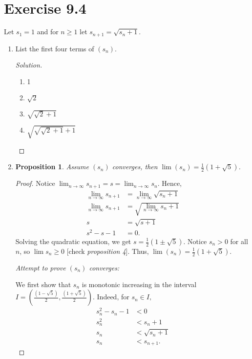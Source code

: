 \documentclass{article}
\newtheorem{proposition}[thm]{Proposition}
\begin{document}
\section*{Exercise 9.4}
Let $s_1=1$ and for $n\ge1$ let $s_{n+1}=\sqrt{s_n+1}$.
\begin{enumerate}[label=(\alph*)]
    \item List the first four terms of $(s_n)$.
    \begin{proof}[Solution]\indent
        \begin{enumerate}[label=\arabic*.]
            \item 1
            \item $\sqrt{2}$
            \item $\sqrt{\sqrt{2}+1}$
            \item $\sqrt{\sqrt{\sqrt{2}+1}+1}$
        \end{enumerate}
    \end{proof}

    \item
    \begin{proposition}
        Assume $(s_n)$ converges, then $\lim (s_n) = \frac{1}{2}\left(1+\sqrt{5}\right)$.
    \end{proposition}
    \begin{proof}
        Notice $\lim_{n\rightarrow\infty}s_{n+1} = s = \lim_{n\rightarrow\infty}s_n$. Hence, 
        \begin{align*}
            \lim_{n\rightarrow\infty} s_{n+1} & = \lim_{n\rightarrow\infty} \sqrt{s_n+1} \\
            \lim_{n\rightarrow\infty} s_{n+1} & = \sqrt{\lim_{n\rightarrow\infty} s_n+1} \\ 
            s & = \sqrt{s+1} \\
            s^2 - s - 1 & = 0.
        \end{align*}
        Solving the quadratic equation, we get $s = \frac{1}{2}\left(1\pm\sqrt{5}\right)$.
        Notice $s_n > 0$ for all $n$, so $\lim s_n\ge 0$ [check \emph{proposition 4}]. Thus, 
        $\lim (s_n) = \frac{1}{2}\left(1+\sqrt{5}\right)$.
        
        \newpage
        \emph{Attempt to prove $(s_n)$ converges:}

        We first show that $s_n$ is monotonic increasing in the interval 
        $I = \left(\frac{\left(1-\sqrt{5}\right)}{2}, \frac{\left(1+\sqrt{5}\right)}{2}\right)$. 
        Indeed, for $s_n\in I,$
        \begin{align*}
            s_n^2 - s_n - 1 & < 0 \\
            s_n^2 & < s_n + 1 \\
            s_n & < \sqrt{s_n + 1} \\
            s_n & < s_{n+1}.
        \end{align*}


\end{proof}
\end{enumerate}
\end{document}
